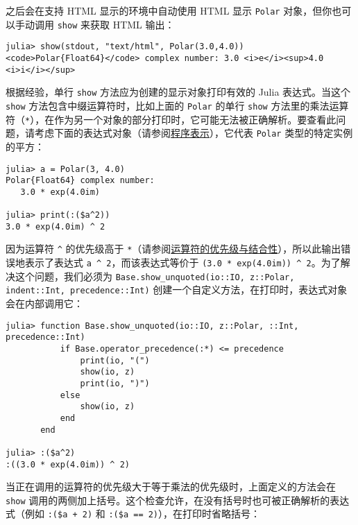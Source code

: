 之后会在支持 HTML 显示的环境中自动使用 HTML 显示 \texttt{Polar} 对象，但你也可以手动调用 \texttt{show} 来获取 HTML 输出：




\begin{verbatim}
julia> show(stdout, "text/html", Polar(3.0,4.0))
<code>Polar{Float64}</code> complex number: 3.0 <i>e</i><sup>4.0 <i>i</i></sup>
\end{verbatim}





根据经验，单行 \texttt{show} 方法应为创建的显示对象打印有效的 Julia 表达式。当这个 \texttt{show} 方法包含中缀运算符时，比如上面的 \texttt{Polar} 的单行 \texttt{show} 方法里的乘法运算符（\texttt{*}），在作为另一个对象的部分打印时，它可能无法被正确解析。要查看此问题，请考虑下面的表达式对象（请参阅\hyperlink{10559372927865899180}{程序表示}），它代表 \texttt{Polar} 类型的特定实例的平方：




\begin{verbatim}
julia> a = Polar(3, 4.0)
Polar{Float64} complex number:
   3.0 * exp(4.0im)

julia> print(:($a^2))
3.0 * exp(4.0im) ^ 2
\end{verbatim}



因为运算符 \texttt{{\textasciicircum}} 的优先级高于 \texttt{*}（请参阅\hyperlink{1006859879084707050}{运算符的优先级与结合性}），所以此输出错误地表示了表达式 \texttt{a {\textasciicircum} 2}，而该表达式等价于 \texttt{(3.0 * exp(4.0im)) {\textasciicircum} 2}。为了解决这个问题，我们必须为 \texttt{Base.show\_unquoted(io::IO, z::Polar, indent::Int, precedence::Int)} 创建一个自定义方法，在打印时，表达式对象会在内部调用它：




\begin{verbatim}
julia> function Base.show_unquoted(io::IO, z::Polar, ::Int, precedence::Int)
           if Base.operator_precedence(:*) <= precedence
               print(io, "(")
               show(io, z)
               print(io, ")")
           else
               show(io, z)
           end
       end

julia> :($a^2)
:((3.0 * exp(4.0im)) ^ 2)
\end{verbatim}



当正在调用的运算符的优先级大于等于乘法的优先级时，上面定义的方法会在 \texttt{show} 调用的两侧加上括号。这个检查允许，在没有括号时也可被正确解析的表达式（例如 \texttt{:(\$a + 2)} 和 \texttt{:(\$a == 2)}），在打印时省略括号：




